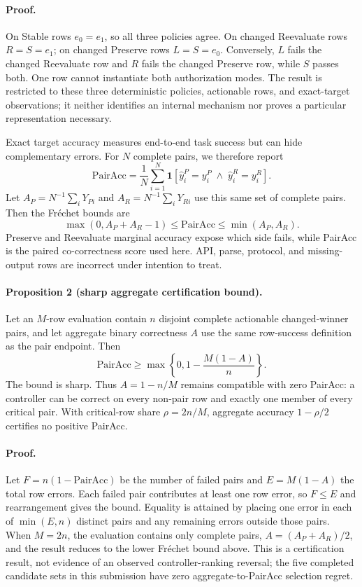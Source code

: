 \documentclass[10pt]{article}
\begin{document}
\paragraph{Proof.}
On Stable rows $e_0=e_1$, so all three policies agree. On changed Reevaluate rows $R=S=e_1$; on
changed Preserve rows $L=S=e_0$. Conversely, $L$ fails the changed Reevaluate row and $R$ fails
the changed Preserve row, while $S$ passes both. One row cannot instantiate both authorization
modes. The result is restricted to these three deterministic policies, actionable rows, and
exact-target observations; it neither identifies an internal mechanism nor proves a particular
representation necessary.

Exact target accuracy measures end-to-end task success but can hide complementary errors.
For $N$ complete pairs, we therefore report
\[
\mathrm{PairAcc}=\frac{1}{N}\sum_{i=1}^N
\mathbf{1}[\hat y_i^P=y_i^P\;\wedge\;\hat y_i^R=y_i^R].
\]
Let $A_P=N^{-1}\sum_iY_{Pi}$ and $A_R=N^{-1}\sum_iY_{Ri}$ use this same set of complete pairs.
Then the Fr\'echet bounds are
\[
\max(0,A_P+A_R-1)\leq\mathrm{PairAcc}\leq\min(A_P,A_R).
\]
Preserve and Reevaluate marginal accuracy expose which side fails, while PairAcc is the paired
co-correctness score used here. API, parse, protocol, and missing-output rows are incorrect under
intention to treat.

\paragraph{Proposition 2 (sharp aggregate certification bound).}
Let an $M$-row evaluation contain $n$ disjoint complete actionable changed-winner pairs, and let
aggregate binary correctness $A$ use the same row-success definition as the pair endpoint. Then
\[
\mathrm{PairAcc}\geq\max\left\{0,1-\frac{M(1-A)}{n}\right\}.
\]
The bound is sharp. Thus $A=1-n/M$ remains compatible with zero PairAcc: a controller can be
correct on every non-pair row and exactly one member of every critical pair. With critical-row
share $\rho=2n/M$, aggregate accuracy $1-\rho/2$ certifies no positive PairAcc.

\paragraph{Proof.}
Let $F=n(1-\mathrm{PairAcc})$ be the number of failed pairs and $E=M(1-A)$ the total row errors.
Each failed pair contributes at least one row error, so $F\leq E$ and rearrangement gives the
bound. Equality is attained by placing one error in each of $\min(E,n)$ distinct pairs and any
remaining errors outside those pairs. When $M=2n$, the evaluation contains only complete pairs,
$A=(A_P+A_R)/2$, and the result reduces to the lower Fr\'echet bound above. This is a certification
result, not evidence of an observed controller-ranking reversal; the five completed candidate
sets in this submission have zero aggregate-to-PairAcc selection regret.
\end{document}
